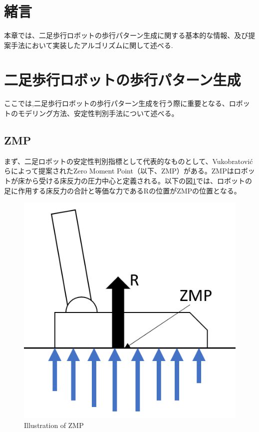 \section{緒言}
本章では、二足歩行ロボットの歩行パターン生成に関する基本的な情報、及び提案手法において実装したアルゴリズムに関して述べる.

\section{二足歩行ロボットの歩行パターン生成}
ここでは,二足歩行ロボットの歩行パターン生成を行う際に重要となる、ロボットのモデリング方法、安定性判別手法について述べる。

\subsection{ZMP}
まず、二足ロボットの安定性判別指標として代表的なものとして、Vukobratovićらによって提案されたZero Moment Point（以下、ZMP）\cite{VUKOBRATOVIC19721}がある。ZMPはロボットが床から受ける床反力の圧力中心と定義される。以下の図\ref{Fig:zmpillust}では、ロボットの足に作用する床反力の合計と等価な力であるRの位置がZMPの位置となる。

\begin{figure}[hbtp]
  \centering
 \includegraphics[keepaspectratio, scale=0.6]
      {images/zmp_ilust.png}
 \caption{Illustration of ZMP }
 \label{Fig:zmpillust}
\end{figure}


